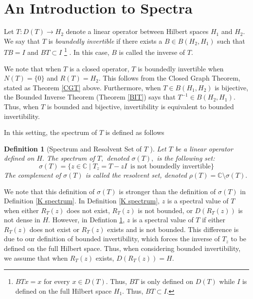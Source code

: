 \documentclass[12pt,a4paper]{article}
\theoremstyle{boldthm}
\theoremstyle{bolddefn}
\newtheorem{definition}[theorem]{Definition}
\begin{document}


\section{An Introduction to Spectra}

Let $T:D(T) \rightarrow H_2$ denote a linear operator between Hilbert spaces $H_1$ and $H_2.$ We say that $T$ is \textit{boundedly invertible} if there exists a $B \in B(H_2, H_1)$ such that $TB = I$ and $BT \subset I$ \footnote{$BTx=x$ for every $x \in D(T).$ Thus, $BT$ is only defined on $D(T)$ while $I$ is defined on the full Hilbert space $H_1.$ Thus, $BT \subset I.$} \cite{Matt}. In this case, $B$ is called the inverse of $T.$

We note that when $T$ is a closed operator, $T$ is boundedly invertible when $N(T) = \{0\}$ and $R(T) = H_2.$ This follows from the Closed Graph Theorem, stated as Theorem \ref{CGT} above. Furthermore, when $T \in B(H_1, H_2)$ is bijective, the Bounded Inverse Theorem (Theorem \ref{BIT}) says that $T^{-1}\in B(H_2, H_1).$ Thus, when $T$ is bounded and bijective, invertibility is equivalent to bounded invertibility. 

In this setting, the spectrum of $T$ is defined as follows 
\begin{definition}[Spectrum and Resolvent Set of $T$ \cite{Matt}] \label{BI spec}
    Let $T$ be a linear operator defined on $H.$ The spectrum of $T,$ denoted $\sigma(T),$ is the following set:
    \begin{equation}
        \sigma(T) = \{ z \in \mathbb{C} \mid T_z = T - zI \, \text{ is not boundedly invertible} \}
    \end{equation}
    The complement of $\sigma(T)$ is called the resolvent set, denoted $\rho(T) = \mathbb{C} \setminus \sigma(T).$
\end{definition}
We note that this definition of $\sigma(T)$ is stronger than the definition of $\sigma(T)$ in Definition \ref{K spectrum}. In Definition \ref{K spectrum}, $z$ is a spectral value of $T$ when either $R_T(z)$ does not exist, $R_T(z)$ is not bounded, or $D(R_T(z))$ is not dense in $H.$ However, in Defintion \ref{BI spec}, $z$ is a spectral value of $T$ if either $R_T(z)$ does not exist or $R_T(z)$ exists and is not bounded. This difference is due to our definition of bounded invertibility, which forces the inverse of $T_z$ to be defined on the full Hilbert space. Thus, when considering bounded invertibility, we assume that when $R_T(z)$ exists, $D(R_T(z)) = H.$ 
\end{document}
